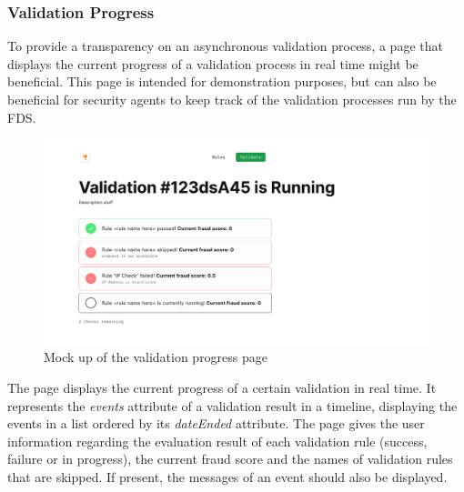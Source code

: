 \newpage
\subsubsection{Validation Progress}

To provide a transparency on an asynchronous validation process, a page that displays the current progress of a validation process in real time might be beneficial. This page is intended for demonstration purposes, but can also be beneficial for security agents to keep track of the validation processes run by the FDS.

\begin{figure}[!h]
 \includegraphics[width=\textwidth]{diagrams/mockup_validation_progress.png}
 \caption{Mock up of the validation progress page}
\end{figure}

The page displays the current progress of a certain validation in real time. It represents the \emph{events} attribute of a validation result in a timeline, displaying the events in a list ordered by its \emph{dateEnded} attribute. The page gives the user information regarding the evaluation result of each validation rule (success, failure or in progress), the current fraud score and the names of validation rules that are skipped. If present, the messages of an event should also be displayed. 